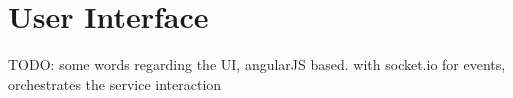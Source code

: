 \section{User Interface}
\label{sec:ui}
%

TODO: some words regarding the UI, angularJS based. with socket.io for events, orchestrates the service interaction